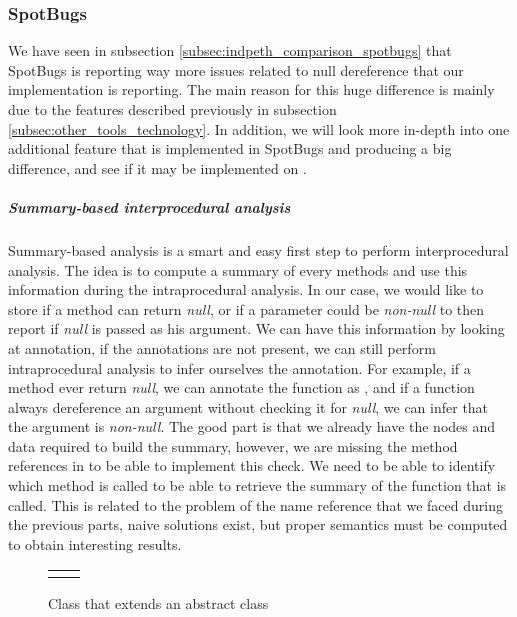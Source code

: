 \subsubsection{SpotBugs}
\label{subsec:spotbugs_specific}

We have seen in subsection \ref{subsec:indpeth_comparison_spotbugs} that SpotBugs is reporting way more issues related to null dereference that our implementation is reporting.
The main reason for this huge difference is mainly due to the features described previously in subsection \ref{subsec:other_tools_technology}.
In addition, we will look more in-depth into one additional feature that is implemented in SpotBugs and producing a big difference, and see if it may be implemented on \slang{}.

\subparagraph{Summary-based interprocedural analysis}
Summary-based analysis is a smart and easy first step to perform interprocedural analysis.
The idea is to compute a summary of every methods and use this information during the intraprocedural analysis. 
In our case, we would like to store if a method can return \emph{null}, or if a parameter could be \emph{non-null} to then report if \emph{null} is passed as his argument.
We can have this information by looking at annotation, if the annotations are not present, we can still perform intraprocedural analysis to infer ourselves the annotation. 
For example, if a method ever return \emph{null}, we can annotate the function as \nullable{}, and if a function always dereference an argument without checking it for \emph{null}, we can infer that the argument is \emph{non-null}. 
The good part is that we already have the nodes and data required to build the summary, however, we are missing the method references in \slang{} to be able to implement this check.
We need to be able to identify which method is called to be able to retrieve the summary of the function that is called.
This is related to the problem of the name reference that we faced during the previous parts, naive solutions exist, but proper semantics must be computed to obtain interesting results.

\begin{figure}[H]
	\centering
	\caption{Class that extends an abstract class}
	\label{figure:class-extends-abtract}
	\setlength{\tabcolsep}{24pt}
	\begin{tabular}{cc}
		\multicolumn{1}{c}{} & \multicolumn{1}{c}{} \\
	\end{tabular}


\end{figure}

